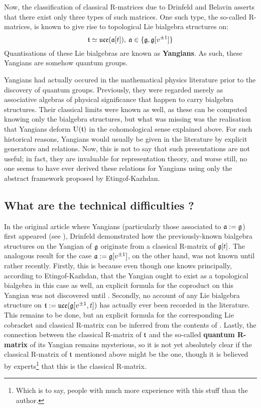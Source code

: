         Now, the classification of classical R-matrices due to Drinfeld and Belavin asserts that there exist only three types of such matrices. One such type, the so-called  R-matrices, is known to give rise to topological Lie bialgebra structures on:
            $$\mathfrak{t} \simeq \mathfrak{uce}( \mathfrak{a}[t] ), \: \mathfrak{a} \in \{\mathfrak{g}, \mathfrak{g}[v^{\pm 1}]\}$$
        Quantisations of these Lie bialgebras are known as \textbf{Yangians}. As such, these Yangians are somehow  quantum groups.

        Yangians had actually occured in the mathematical physics literature prior to the discovery of quantum groups. Previously, they were regarded merely as associative algebras of physical significance that happen to carry bialgebra structures. Their classical limits were known as well, as these can be computed knowing only the bialgebra structures, but what was missing was the realisation that Yangians deform $\mathrm{U}(\mathfrak{t})$ in the cohomological sense explained above. For such historical reasons, Yangians would usually be given in the literature by explicit generators and relations. Now, this is not to say that such presentations are not useful; in fact, they are invaluable for representation theory, and worse still, no one seems to have ever derived these relations for Yangians using only the abstract framework proposed by Etingof-Kazhdan. 

    \subsection{What are the technical difficulties ?}
        In the original article where Yangians (particularly those associated to $\mathfrak{a} := \mathfrak{g}$) first appeared (see \cite{drinfeld_original_yangian_paper}), Drinfeld demonstrated how the previously-known bialgebra structures on the Yangian of $\mathfrak{g}$ originate from a classical R-matrix of $\mathfrak{g}[t]$. The analogous result for the case $\mathfrak{a} := \mathfrak{g}[v^{\pm 1}]$, on the other hand, was not known until rather recently. Firstly, this is because even though one knows principally, according to Etingof-Kazhdan, that the Yangian ought to exist as a topological bialgebra in this case as well, an explicit formula for the coproduct on this Yangian was not discovered until \cite{guay_nakajima_wendlandt_affine_yangian_coproduct}. Secondly, no account of any Lie bialgebra structure on $\mathfrak{t} := \mathfrak{uce}(\mathfrak{g}[v^{\pm 1}, t])$ has actually ever been recorded in the literature. This remains to be done, but an explicit formula for the corresponding Lie cobracket and classical R-matrix can be inferred from the contents of \cite[Chapter 3]{msc_thesis_gamma_extended_toroidal_lie_algebras}. Lastly, the connection between the classical R-matrix of $\mathfrak{t}$ and the so-called \textbf{quantum R-matrix} of its Yangian remains mysterious, so it is not yet absolutely clear if the classical R-matrix of $\mathfrak{t}$ mentioned above might be the  one, though it is believed by experts\footnote{Which is to say, people with much more experience with this stuff than the author.} that this is the  classical R-matrix.

